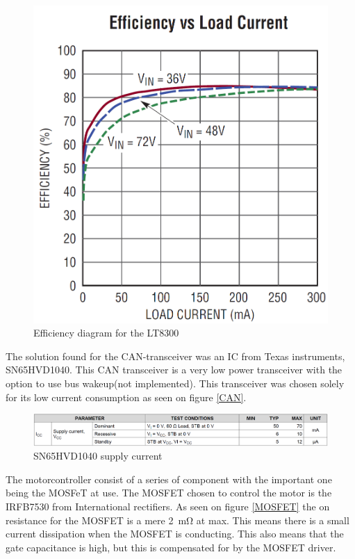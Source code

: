 \begin{figure}[H]
	\centering
	\includegraphics[width=1\linewidth]{Hardware/Pictures/LT8300}
	\caption{Efficiency diagram for the LT8300}
	\label{fig:LT8300}
\end{figure}

The solution found for the CAN-transceiver was an IC from Texas instruments, SN65HVD1040\cite{CAN}. This CAN transceiver is a very low power transceiver with the option to use bus wakeup(not implemented). This transceiver was chosen solely for its low current consumption as seen on figure \vref{CAN}. 

\begin{figure}[H]
	\centering
	\includegraphics[width=1\linewidth]{Hardware/Pictures/CAN}
	\caption{SN65HVD1040 supply current}
	\label{fig:CAN}
\end{figure}

The motorcontroller consist of a series of component with the important one being the MOSFeT at use. The MOSFET chosen to control the motor is the IRFB7530\cite{IRFB7530} from International rectifiers. As seen on figure \vref{MOSFET} the on resistance for the MOSFET is a mere \SI{2}{\milli \ohm} at max. This means there is a small current dissipation when the MOSFET is conducting. This also means that the gate capacitance is high, but this is compensated for by the MOSFET driver.  

